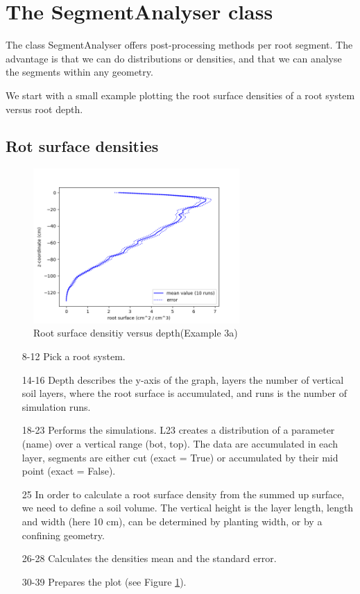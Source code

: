 \newpage
\section{The SegmentAnalyser class} \label{sec:sa}

The class SegmentAnalyser offers post-processing methods per root segment. The advantage is that we can do distributions or densities, and that we can analyse the segments within any geometry. 

We start with a small example plotting the root surface densities of a root system versus root depth.

\subsection{Rot surface densities}



\begin{figure}
\centering
\includegraphics[width=0.7\textwidth]{example_3c.png}
\caption{Root surface densitiy versus depth(Example 3a)} \label{fig:surface_density}
\end{figure}


\begin{itemize}

\item[8-12] Pick a root system.
\item[14-16] Depth describes the y-axis of the graph, layers the number of vertical soil layers, where the root surface is accumulated, and runs is the number of simulation runs. 
\item[18-23] Performs the simulations. L23 creates a distribution of a parameter (name) over a vertical range (bot, top). The data are accumulated in each layer, segments are either cut (exact = True) or accumulated by their mid point (exact = False). 
\item[25] In order to calculate a root surface density from the summed up surface, we need to define a soil volume. The vertical height is the layer length, length and width (here 10 cm), can be determined by planting width, or by a confining geometry. 
\item[26-28] Calculates the densities mean and the standard error. 
\item[30-39] Prepares the plot (see Figure \ref{fig:surface_density}).

\end{itemize}



